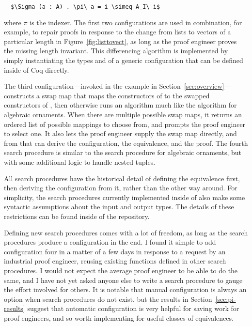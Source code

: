 \begin{lstlisting}
  $\Sigma (a : A) . \pi\ a = i \simeq A_I\ i$
\end{lstlisting}
where $\pi$ is the indexer.
The first two configurations are used in combination, for example,
to repair proofs in response to the change from lists to vectors of a particular length in Figure~\ref{fig:listtovect},
as long as the proof engineer proves the missing length invariant.
This differencing algorithm is implemented by simply instantiating the types \Aa and \B of a generic 
configuration that can be defined inside of Coq directly.

The third configuration---invoked in the example in Section~\ref{sec:overview}---constructs a swap map
that maps the constructors of \Aa to the swapped constructors of \B, then otherwise runs an algorithm much like
the algorithm for algebraic ornaments.
When there are multiple possible swap maps, it returns an ordered list of possible mappings to choose from,
and prompts the proof engineer to select one. %
It also lets the proof engineer supply the swap map directly, and from that can derive the configuration, the equivalence, and the proof.
The fourth search procedure is similar to the search procedure for algebraic ornaments, but with some additional logic
to handle nested tuples.

All search procedures have the historical detail of defining the equivalence first, then deriving the configuration from it,
rather than the other way around.
For simplicity, the search procedures currently implemented inside of \toolnamec also make some syntactic assumptions
about the input and output types.
The details of these restrictions can be found inside of the repository. %

Defining new search procedures comes with a lot of freedom, as long as the search procedures produce a configuration in the end.
I found it simple to add configuration four in a matter of a few days in response to a request by an industrial proof engineer,
reusing existing functions defined in other search procedures.
I would not expect the average proof engineer to be able to do the same, and I have not yet asked anyone else to write a search procedure
to gauge the effort involved for others.
It is notable that manual configuration is always an option when search procedures do not exist,
but the results in Section~\ref{sec:pi-results} suggest that automatic configuration is very helpful for saving work for proof engineers,
and so worth implementing for useful classes of equivalences.

